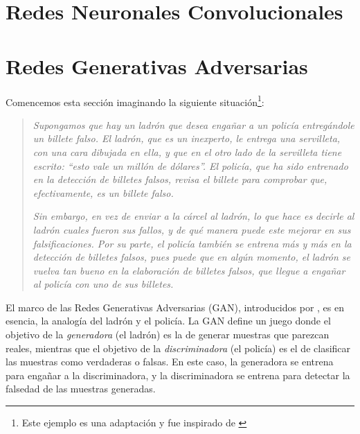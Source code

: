 {{}  %


\section{Redes Neuronales Convolucionales}\label{sec:redes-neuronales-convolucionales}
{
}  %


\section{Redes Generativas Adversarias}\label{sec:redes-generativas-adversarias-GAN}
{
Comencemos esta sección imaginando la siguiente situación\footnote{Este ejemplo es una adaptación y fue inspirado de \cite[min. 4:32]{santana2017creando}}:
\begin{quotation}
    \textit{Supongamos que hay un ladrón que desea engañar a un policía entregándole un billete falso. El ladrón, que es un inexperto, le entrega una servilleta, con una cara dibujada en ella, y que en el otro lado de la servilleta tiene escrito: ``\emph{esto vale un millón de dólares}''. El policía, que ha sido entrenado en la detección de billetes falsos, revisa el billete para comprobar que, efectivamente, es un billete falso.}

    \textit{Sin embargo, en vez de enviar a la cárcel al ladrón, lo que hace es decirle al ladrón cuales fueron sus fallos, y de qué manera puede este mejorar en sus falsificaciones. Por su parte, el policía también se entrena más y más en la detección de billetes falsos, pues puede que en algún momento, el ladrón se vuelva tan bueno en la elaboración de billetes falsos, que llegue a engañar al policía con uno de sus billetes.}
\end{quotation}


El marco de las Redes Generativas Adversarias (GAN), introducidos por \cite{goodfellow2014generative}, es en esencia, la analogía del ladrón y el policía.
La GAN define un juego donde el objetivo de la \emph{generadora} (el ladrón) es la de generar muestras que parezcan reales, mientras que el objetivo de la \emph{discriminadora} (el policía) es el de clasificar las muestras como verdaderas o falsas.
En este caso, la generadora se entrena para engañar a la discriminadora, y la discriminadora se entrena para detectar la falsedad de las muestras generadas.

}}
